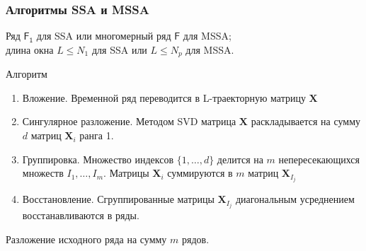 \documentclass[ucs, notheorems, handout]{beamer}
\newcommand{\X}{\mathbf{X}}
\begin{document}
\begin{frame}
    \frametitle{Алгоритмы SSA и MSSA}
    Ряд $\mathsf{F_1}$ для SSA или многомерный ряд $\mathsf{F}$ для MSSA;\\
    длина окна $L \leq N_1$ для SSA или $L \leq N_p$ для MSSA.\\
    
    \begin{block}{Алгоритм}
        \begin{enumerate}
            \item Вложение. Временной ряд переводится в L-траекторную матрицу $\X$
            \item Сингулярное разложение. Методом SVD матрица $\X$ раскладывается на сумму $d$ матриц $\X_i$ ранга 1.
            \item Группировка. Множество индексов $\{1, \dots, d\}$ делится на $m$ непересекающихся множеств $I_1 ,\dots, I_m$. Матрицы $\X_i$ суммируются в $m$ матриц $\X_{I_j}$
            \item Восстановление. Сгруппированные матрицы $\X_{I_j}$ диагональным усреднением восстанавливаются в ряды.
        \end{enumerate}
        
    \end{block}
    
    Разложение исходного ряда на сумму $m$ рядов.
    \note{

    }
\end{frame}
\end{document}
